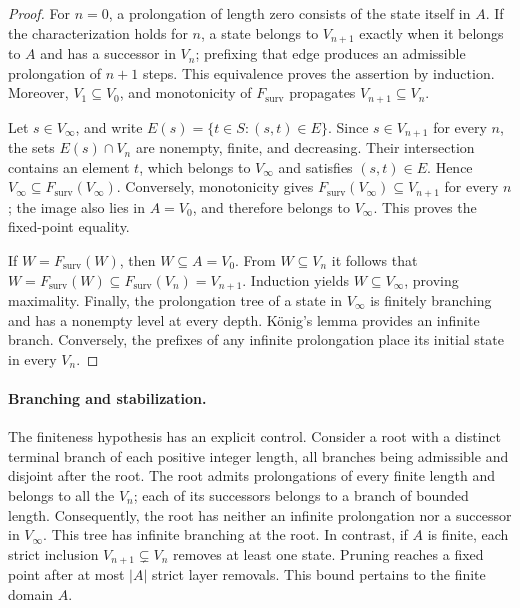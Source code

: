 \begin{proof}
For \(n=0\), a prolongation of length zero consists of the state
itself in \(A\). If the characterization holds for \(n\), a state
belongs to \(V_{n+1}\) exactly when it belongs to \(A\) and has a
successor in \(V_n\); prefixing that edge produces an admissible
prolongation of \(n+1\) steps. This equivalence proves the assertion by
induction. Moreover, \(V_1\subseteq V_0\), and monotonicity of
\(F_{\mathrm{surv}}\) propagates \(V_{n+1}\subseteq V_n\).

Let \(s\in V_\infty\), and write
\(E(s)=\{t\in S:(s,t)\in E\}\). Since \(s\in V_{n+1}\) for every \(n\),
the sets \(E(s)\cap V_n\) are nonempty, finite, and decreasing.
Their intersection contains an element \(t\), which belongs to
\(V_\infty\) and satisfies \((s,t)\in E\). Hence
\(V_\infty\subseteq F_{\mathrm{surv}}(V_\infty)\).
Conversely, monotonicity gives
\(F_{\mathrm{surv}}(V_\infty)\subseteq V_{n+1}\) for every \(n\);
the image also lies in \(A=V_0\), and therefore belongs to
\(V_\infty\). This proves the fixed-point equality.

If \(W=F_{\mathrm{surv}}(W)\), then \(W\subseteq A=V_0\).
From \(W\subseteq V_n\) it follows that
\(W=F_{\mathrm{surv}}(W)\subseteq F_{\mathrm{surv}}(V_n)=V_{n+1}\).
Induction yields \(W\subseteq V_\infty\), proving maximality.
Finally, the prolongation tree of a state in \(V_\infty\) is finitely
branching and has a nonempty level at every depth. K\"onig's lemma
provides an infinite branch. Conversely, the prefixes of any infinite
prolongation place its initial state in every \(V_n\).
\end{proof}

\paragraph{Branching and stabilization.}
The finiteness hypothesis has an explicit control. Consider a root
with a distinct terminal branch of each positive integer length, all
branches being admissible and disjoint after the root. The root
admits prolongations of every finite length and belongs to all the
\(V_n\); each of its successors belongs to a branch of bounded length.
Consequently, the root has neither an infinite prolongation nor a
successor in \(V_\infty\). This tree has infinite branching at the
root. In contrast, if \(A\) is finite, each strict inclusion
\(V_{n+1}\subsetneq V_n\) removes at least one state. Pruning reaches
a fixed point after at most \(|A|\) strict layer removals.
This bound pertains to the finite domain \(A\).

